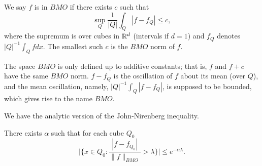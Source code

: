 \begin{definition}\label{def:ch4_7.5}
We say $f$ is in $BMO$ if there exists $c$ such that
\[
    \sup_Q \frac{1}{|Q|}\int_Q |f - f_Q| \leq c,
\]
where the supremum is over cubes in $\mathbb{R}^d$ (intervals if $d = 1$) and $f_Q$ denotes $|Q|^{-1}\int_Q f dx$. The smallest such $c$ is the $BMO$ norm of $f$.
\end{definition}

The space $BMO$ is only defined up to additive constants; that is, $f$ and $f + c$ have the same $BMO$ norm. $f - f_Q$ is the oscillation of $f$ about its mean (over $Q$), and the mean oscillation, namely, $|Q|^{-1}\int_Q|f - f_Q|$, is supposed to be bounded, which gives rise to the name $BMO$.

We have the analytic version of the John-Nirenberg inequality.

\begin{proposition}\label{prop:ch4_7.6}
There exists $\alpha$ such that for each cube $Q_0$
\begin{equation}\label{eq:ch4_7.5}
    \Big|\Big\{x \in Q_0 : \frac{|f - f_{Q_0}|}{\|f\|_{BMO}} > \lambda\Big\}\Big| \leq e^{-\alpha\lambda}.
\end{equation}
\end{proposition}


